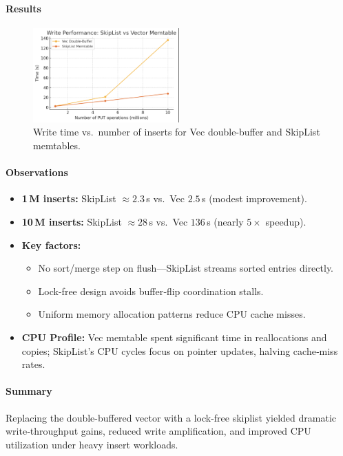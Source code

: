 \documentclass[10pt]{article}
\begin{document}
\paragraph{Results}
\begin{figure}[htbp]
  \centering
  \includegraphics[width=0.5\textwidth]{skiplist_v_memtable.png}
  \caption{Write time vs.\ number of inserts for Vec double-buffer and SkipList memtables.}
  \label{fig:memtable_comparison}
\end{figure}

\paragraph{Observations}
\begin{itemize}[itemsep=0.5ex]
  \item \textbf{1\,M inserts:} SkipList $\approx2.3\,$s vs.\ Vec $2.5\,$s (modest improvement).
  \item \textbf{10\,M inserts:} SkipList $\approx28\,$s vs.\ Vec $136\,$s (nearly $5\times$ speedup).
  \item \textbf{Key factors:}
    \begin{itemize}[itemsep=0.3ex]
      \item No sort/merge step on flush—SkipList streams sorted entries directly.
      \item Lock-free design avoids buffer‐flip coordination stalls.
      \item Uniform memory allocation patterns reduce CPU cache misses.
    \end{itemize}
  \item \textbf{CPU Profile:} Vec memtable spent significant time in reallocations and copies; SkipList’s CPU cycles focus on pointer updates, halving cache‐miss rates.
\end{itemize}

\paragraph{Summary}
Replacing the double-buffered vector with a lock-free skiplist yielded dramatic write‐throughput gains, reduced write amplification, and improved CPU utilization under heavy insert workloads.
\end{document}
